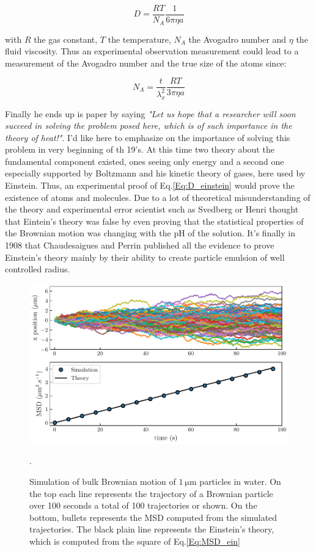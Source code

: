 \begin{equation}
	D = \frac{R T}{N_A}\frac{1}{6\pi \eta a}
	\label{Eq:D_einstein}
\end{equation}

with $R$ the gas constant, $T$ the temperature, $N_A$ the Avogadro number and $\eta$ the fluid viscosity. Thus an experimental observation measurement could lead to a measurement of the Avogadro number and the true size of the atoms since:

\begin{equation}
	N_A = \frac{t}{\lambda_x^2} \frac{RT}{3\pi \eta a}
\end{equation}

Finally he ends up is paper \cite{einstein_uber_1905} by saying \textit{"Let us hope that a researcher will soon succeed in solving the problem posed here, which is of such importance in the theory of heat!"}. I'd like here to emphasize on the importance of solving this problem in very beginning of th 19's. At this time two theory about the fundamental component existed, ones seeing only energy and a second one especially supported by Boltzmann and his kinetic theory of gases, here used by Einstein. Thus, an experimental proof of Eq.\ref{Eq:D_einstein} would prove the existence of atoms and molecules. Due to a lot of theoretical misunderstanding of the theory and experimental error scientist such as Svedberg or Henri thought that Eintein's theory was false \cite{genthon_concept_2020} by even proving that the statistical properties of the Brownian motion was changing with the pH of the solution. It's finally in 1908 that Chaudesaigues and Perrin published all the evidence to prove Einstein's theory mainly by their ability to create particle emulsion of well controlled radius. 

\begin{figure}
	\centering
	\includegraphics{02_body/chapter1/image/brown_exemple.pdf}
	\caption{Simulation of bulk Brownian motion of $1 ~ \mathrm{\mu m}$ particles in water. On the top each line represents the trajectory of a Brownian particle over 100 seconds a total of 100 trajectories or shown. On the bottom, bullets represents the \gls{MSD} computed from the simulated trajectories. The black plain line represents the Einstein's theory, which is computed from the square of Eq.\ref{Eq:MSD_ein}}.
\end{figure}